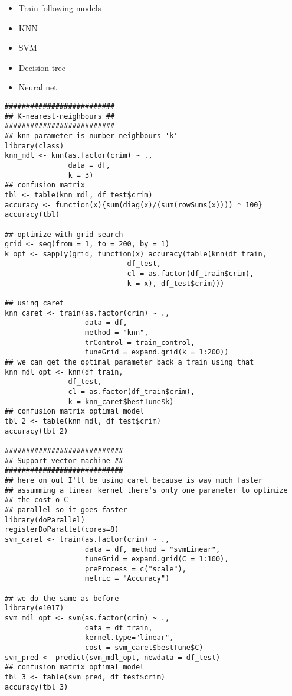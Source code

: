 \documentclass[11pt]{article}
\begin{document}
\begin{itemize}
\item Train following models
\item KNN
\item SVM
\item Decision tree
\item Neural net
\end{itemize}
\begin{verbatim}
##########################
## K-nearest-neighbours ##
##########################
## knn parameter is number neighbours 'k'
library(class)
knn_mdl <- knn(as.factor(crim) ~ .,
               data = df,
               k = 3)
## confusion matrix
tbl <- table(knn_mdl, df_test$crim)
accuracy <- function(x){sum(diag(x)/(sum(rowSums(x)))) * 100}
accuracy(tbl)

## optimize with grid search
grid <- seq(from = 1, to = 200, by = 1)
k_opt <- sapply(grid, function(x) accuracy(table(knn(df_train,
                             df_test,
                             cl = as.factor(df_train$crim),
                             k = x), df_test$crim)))

## using caret
knn_caret <- train(as.factor(crim) ~ .,
                   data = df,
                   method = "knn",
                   trControl = train_control,
                   tuneGrid = expand.grid(k = 1:200))
## we can get the optimal parameter back a train using that
knn_mdl_opt <- knn(df_train,
               df_test,
               cl = as.factor(df_train$crim),
               k = knn_caret$bestTune$k)
## confusion matrix optimal model
tbl_2 <- table(knn_mdl, df_test$crim)
accuracy(tbl_2)

############################
## Support vector machine ##
############################
## here on out I'll be using caret because is way much faster
## assumming a linear kernel there's only one parameter to optimize
## the cost o C
## parallel so it goes faster
library(doParallel)
registerDoParallel(cores=8)
svm_caret <- train(as.factor(crim) ~ .,
                   data = df, method = "svmLinear",
                   tuneGrid = expand.grid(C = 1:100),
                   preProcess = c("scale"),
                   metric = "Accuracy")

## we do the same as before
library(e1017)
svm_mdl_opt <- svm(as.factor(crim) ~ .,
                   data = df_train,
                   kernel.type="linear",
                   cost = svm_caret$bestTune$C)
svm_pred <- predict(svm_mdl_opt, newdata = df_test)
## confusion matrix optimal model
tbl_3 <- table(svm_pred, df_test$crim)
accuracy(tbl_3)


\end{verbatim}
\end{document}
